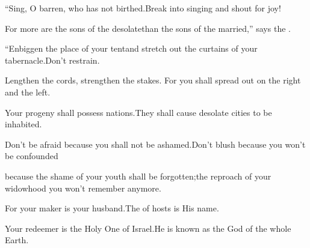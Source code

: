 
\begin{inparaenum}
  \pb {} ``Sing, O barren, who has not birthed.\pa Break into singing and shout for joy!%
  
  \pc For more are the sons of the desolate\pa than the sons of the married,'' says the \lord.%
  
  \pb {} ``Enbiggen the place of your tent\pa and stretch out the curtains of your tabernacle.\pa Don't restrain.%
  
  \pc Lengthen the cords, strengthen the stakes.\pa {} For you shall spread out on the right and the left.%
  
  \pc Your progeny shall possess nations.\pa They shall cause desolate cities to be inhabited.%
  
  \pc {} Don't be afraid because you shall not be ashamed.\pa Don't blush because you won't be confounded%
  
  \pc because the shame of your youth shall be forgotten;\pa the reproach of your widowhood you won't remember anymore.%
  
  \pb {} For your maker is your husband.\pa The \lord of hosts is His name.%
  
  \pc Your redeemer is the Holy One of Israel.\pa He is known as the God of the whole Earth.
  
  \pb {} %
\end{inparaenum}
